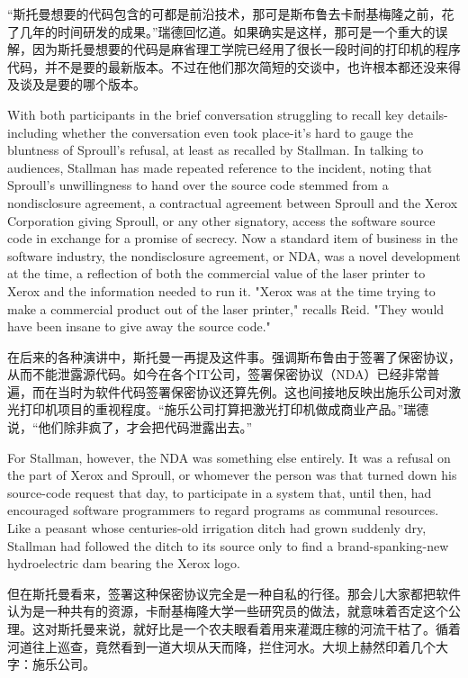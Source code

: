 \ifdefined\chs
``斯托曼想要的代码包含的可都是前沿技术，那可是斯布鲁去卡耐基梅隆之前，花了几年的时间研发的成果。''瑞德回忆道。如果确实是这样，那可是一个重大的误解，因为斯托曼想要的代码是麻省理工学院已经用了很长一段时间的打印机的程序代码，并不是要的最新版本。不过在他们那次简短的交谈中，也许根本都还没来得及谈及是要的哪个版本。
\fi

\ifdefined\eng
With both participants in the brief conversation struggling to recall key details-including whether the conversation even took place-it's hard to gauge the bluntness of Sproull's refusal, at least as recalled by Stallman. In talking to audiences, Stallman has made repeated reference to the incident, noting that Sproull's unwillingness to hand over the source code stemmed from a nondisclosure agreement, a contractual agreement between Sproull and the Xerox Corporation giving Sproull, or any other signatory, access the software source code in exchange for a promise of secrecy. Now a standard item of business in the software industry, the nondisclosure agreement, or NDA, was a novel development at the time, a reflection of both the commercial value of the laser printer to Xerox and the information needed to run it. "Xerox was at the time trying to make a commercial product out of the laser printer," recalls Reid. "They would have been insane to give away the source code."
\fi

\ifdefined\chs
在后来的各种演讲中，斯托曼一再提及这件事。强调斯布鲁由于签署了保密协议，从而不能泄露源代码。如今在各个IT公司，签署保密协议（NDA）已经非常普遍，而在当时为软件代码签署保密协议还算先例。这也间接地反映出施乐公司对激光打印机项目的重视程度。``施乐公司打算把激光打印机做成商业产品。''瑞德说，``他们除非疯了，才会把代码泄露出去。''
\fi

\ifdefined\eng
For Stallman, however, the NDA was something else entirely. It was a refusal on the part of Xerox and Sproull, or whomever the person was that turned down his source-code request that day, to participate in a system that, until then, had encouraged software programmers to regard programs as communal resources. Like a peasant whose centuries-old irrigation ditch had grown suddenly dry, Stallman had followed the ditch to its source only to find a brand-spanking-new hydroelectric dam bearing the Xerox logo.
\fi

\ifdefined\chs
但在斯托曼看来，签署这种保密协议完全是一种自私的行径。那会儿大家都把软件认为是一种共有的资源，卡耐基梅隆大学一些研究员的做法，就意味着否定这个公理。这对斯托曼来说，就好比是一个农夫眼看着用来灌溉庄稼的河流干枯了。循着河道往上巡查，竟然看到一道大坝从天而降，拦住河水。大坝上赫然印着几个大字：施乐公司。
\fi

